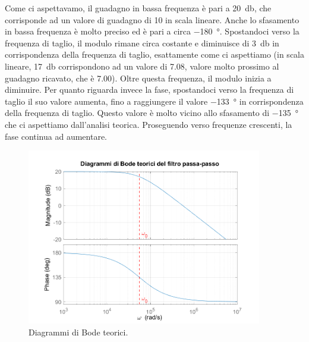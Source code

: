 \documentclass{report}
\begin{document}
Come ci aspettavamo, il guadagno in bassa frequenza è pari a \SI{20}{\decibel}, che corrisponde ad un valore di guadagno di 10 in scala lineare. Anche lo sfasamento in bassa frequenza è molto preciso ed è pari a circa \SI{-180}{\degree}. Spostandoci verso la frequenza di taglio, il modulo rimane circa costante e diminuisce di \SI{3}{\decibel} in corrispondenza della frequenza di taglio, esattamente come ci aspettiamo (in scala lineare, \SI{17}{\decibel} corrispondono ad un valore di 7.08, valore molto prossimo al guadagno ricavato, che è 7.00). Oltre questa frequenza, il modulo inizia a diminuire. Per quanto riguarda invece la fase, spostandoci verso la frequenza di taglio il suo valore aumenta, fino a raggiungere il valore \SI{-133}{\degree} in corrispondenza della frequenza di taglio. Questo valore è molto vicino allo sfasamento di \SI{-135}{\degree} che ci aspettiamo dall'analisi teorica. Proseguendo verso frequenze crescenti, la fase continua ad aumentare. \par
\begin{figure}[h!]
	\centering
	\includegraphics[height=7.7cm]{immagini/Bode_teo}
	\caption{Diagrammi di Bode teorici.}
	\label{figura:bodeteorici}
\end{figure}
\end{document}
